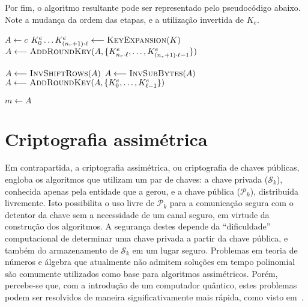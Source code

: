 \documentclass[12pt]{report}
\newcommand{\pk}{$\mathcal{P}_k$}
\newcommand{\sk}{$\mathcal{S}_k$}
\begin{document}
Por fim, o algoritmo resultante pode ser representado pelo pseudocódigo abaixo. Note a mudança da ordem das etapas, e a utilização invertida de $K_e$.

\begin{algorithm}[H]
    \small

    $A \longleftarrow c$\;
    $K^{e}_{0} \dots K^{e}_{(n_r + 1) \cdot \ell}
        \longleftarrow \textsc{KeyExpansion}(K)$\;
    $A \longleftarrow \textsc{AddRoundKey}(A,
        \{K^{e}_{n_r \cdot \ell}, \dots, K^{e}_{(n_r + 1) \cdot \ell - 1}\})$\;
    
 
    $A \longleftarrow \textsc{InvShiftRows}(A)$\;
    $A \longleftarrow \textsc{InvSubBytes}(A)$\;
    $A \longleftarrow \textsc{AddRoundKey}(A,
        \{K^{e}_{0}, \dots, K^{e}_{\ell - 1}\})$\;

    $m \longleftarrow A$\;
\end{algorithm}

\section{Criptografia assimétrica}

Em contrapartida, a criptografia assimétrica, ou criptografia de chaves
públicas, engloba os algoritmos que utilizam um par de chaves: a chave privada
(\sk{}), conhecida apenas pela entidade que a gerou, e a chave pública (\pk{}),
distribuída livremente. Isto possibilita o uso livre de \pk{} para a
comunicação segura com o detentor da chave sem a necessidade de um canal
seguro, em virtude da construção dos algoritmos. A segurança destes depende da
``dificuldade'' computacional de determinar uma chave privada a partir da chave
pública, e também do armazenamento de \sk{} em um lugar seguro. Problemas em
teoria de números e álgebra que atualmente não admitem soluções em tempo
polinomial são comumente utilizados como base para algoritmos assimétricos.
Porém, percebe-se que, com a introdução de um computador quântico, estes
problemas podem ser resolvidos de maneira significativamente mais rápida, como
visto em~\cite{Shor:1997:PAP:264393.264406}.
\end{document}
